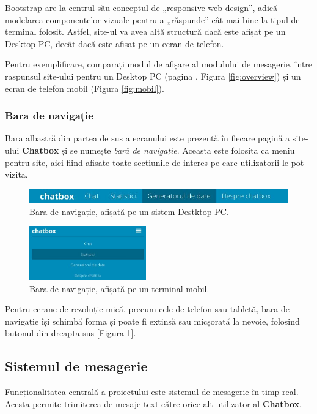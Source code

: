 \documentclass[12pt,a4paper]{article}
\begin{document}
Bootstrap are la centrul său conceptul de „responsive web design\cite{rwd}”, adică modelarea componentelor
vizuale pentru a „răspunde” cât mai bine la tipul de terminal folosit. Astfel, site-ul va avea altă structură dacă este afișat pe un Desktop PC, decât dacă este afișat pe un ecran de telefon.

Pentru exemplificare, comparați modul de afișare al modulului de mesagerie, între 
raspunsul site-ului pentru un Desktop PC (pagina \pageref{fig:overview}, Figura \ref{fig:overview}) și un ecran de telefon mobil (Figura \ref{fig:mobil}).

\subsubsection{Bara de navigație}
Bara albastră din partea de sus a ecranului este prezentă în fiecare pagină  
a site-ului \textbf{Chatbox} și se numește \textit{bară de navigație}. Aceasta 
este folosită ca meniu pentru site, aici fiind afișate toate secțiunile de interes
pe care utilizatorii le pot vizita. 

\begin{figure}[!h]
	\centering
	\includegraphics[width=\textwidth]{img/meniu_mare.jpg}
	\vspace{-15px}
	\caption{Bara de navigație, afișată pe un sistem Destktop PC.}
\end{figure}

\begin{figure}[!h]
	\centering
	\includegraphics[width=0.45\textwidth]{img/meniu_mobil.jpg}
	\caption{Bara de navigație, afișată pe un terminal mobil.}
	\label{fig:nav-mobil}
\end{figure}

Pentru ecrane de rezoluție mică, precum cele de telefon sau tabletă, bara de navigație își schimbă forma și poate fi extinsă sau micșorată la nevoie, 
folosind butonul din dreapta-sus [Figura \ref{fig:nav-mobil}].

\subsection{Sistemul de mesagerie}
Funcționalitatea centrală a proiectului este sistemul de mesagerie în timp real. 
Acesta permite trimiterea de mesaje text către orice alt utilizator al \textbf{Chatbox}.
\end{document}
